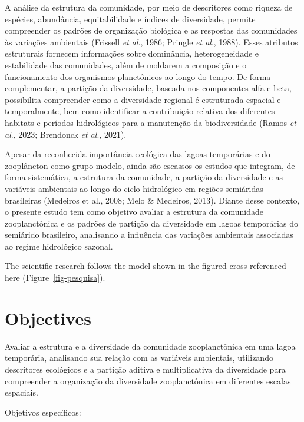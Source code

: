 \documentclass[
  american,
  letterpaper,
  DIV=11,
  numbers=noendperiod]{scrartcl}
\begin{document}
A análise da estrutura da comunidade, por meio de descritores como
riqueza de espécies, abundância, equitabilidade e índices de
diversidade, permite compreender os padrões de organização biológica e
as respostas das comunidades às variações ambientais (Frissell \emph{et
al}., 1986; Pringle \emph{et al}., 1988). Esses atributos estruturais
fornecem informações sobre dominância, heterogeneidade e estabilidade
das comunidades, além de moldarem a composição e o funcionamento dos
organismos planctônicos ao longo do tempo. De forma complementar, a
partição da diversidade, baseada nos componentes alfa e beta,
possibilita compreender como a diversidade regional é estruturada
espacial e temporalmente, bem como identificar a contribuição relativa
dos diferentes habitats e períodos hidrológicos para a manutenção da
biodiversidade (Ramos \emph{et al}., 2023; Brendonck \emph{et al}.,
2021).

Apesar da reconhecida importância ecológica das lagoas temporárias e do
zooplâncton como grupo modelo, ainda são escassos os estudos que
integram, de forma sistemática, a estrutura da comunidade, a partição da
diversidade e as variáveis ambientais ao longo do ciclo hidrológico em
regiões semiáridas brasileiras (Medeiros et al., 2008; Melo \& Medeiros,
2013). Diante desse contexto, o presente estudo tem como objetivo
avaliar a estrutura da comunidade zooplanctônica e os padrões de
partição da diversidade em lagoas temporárias do semiárido brasileiro,
analisando a influência das variações ambientais associadas ao regime
hidrológico sazonal.

The scientific research follows the model shown in the figured
cross-referenced here (Figure~\ref{fig-pesquisa}).

\section{Objectives}\label{objectives}

Avaliar a estrutura e a diversidade da comunidade zooplanctônica em uma
lagoa temporária, analisando sua relação com as variáveis ambientais,
utilizando descritores ecológicos e a partição aditiva e multiplicativa
da diversidade para compreender a organização da diversidade
zooplanctônica em diferentes escalas espaciais.

Objetivos específicos:
\end{document}
